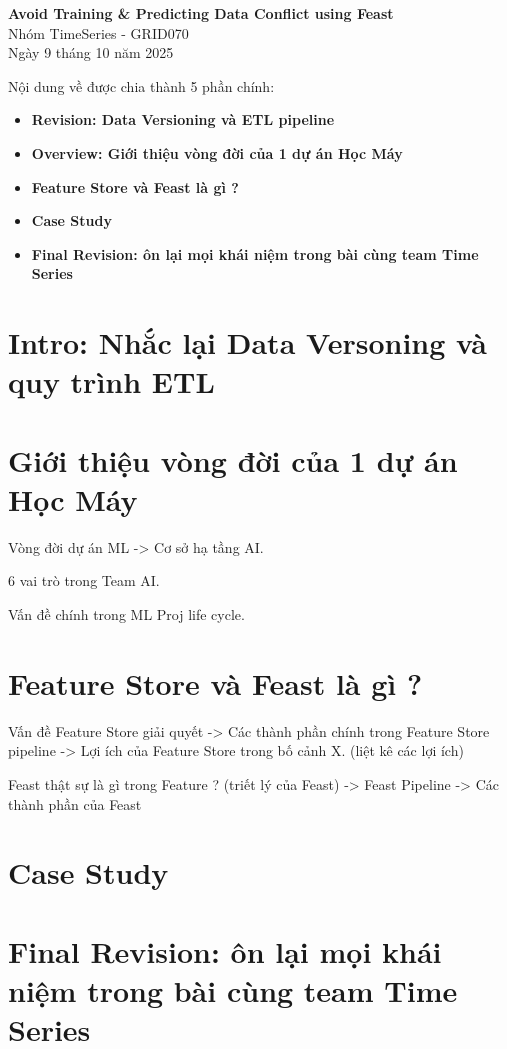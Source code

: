\documentclass[11pt]{article}
\renewcommand{\maketitle}{
    \begin{center}
        \fontsize{18}{20}\selectfont\textbf{Avoid Training \& Predicting Data Conflict using Feast}\\[1em]
        \fontsize{14}{16}\selectfont Nhóm TimeSeries - GRID070\\[0.5em]
        \fontsize{14}{16}\selectfont Ngày 9 tháng 10 năm 2025
    \end{center}
    \vspace{1.5em}
}
\begin{document}
\maketitle

\begin{summarybox}
Nội dung về được chia thành 5 phần chính:
    \begin{itemize}
	\item \textbf{Revision: Data Versioning và ETL pipeline}	
	\item \textbf{Overview: Giới thiệu vòng đời của 1 dự án Học Máy}
	\item \textbf{Feature Store và Feast là gì ?}
	\item \textbf{Case Study}
	\item \textbf{Final Revision: ôn lại mọi khái niệm trong bài cùng team Time Series}
    \end{itemize}
\end{summarybox}


\section{Intro: Nhắc lại Data Versoning và quy trình ETL}	

\section{Giới thiệu vòng đời của 1 dự án Học Máy}

Vòng đời dự án ML -> Cơ sở hạ tầng AI.

6 vai trò trong Team AI. 

Vấn đề chính trong ML Proj life cycle. 

\section{Feature Store và Feast là gì ?}
Vấn đề Feature Store giải quyết -> Các thành phần chính trong Feature Store pipeline -> Lợi ích của Feature Store trong bố cảnh X. (liệt kê các lợi ích)

Feast thật sự là gì trong Feature  ? (triết lý của Feast) 	-> Feast Pipeline  -> Các thành phần của Feast 



\section{Case Study}



\section{Final Revision: ôn lại mọi khái niệm trong bài cùng team Time Series}


\end{document}
